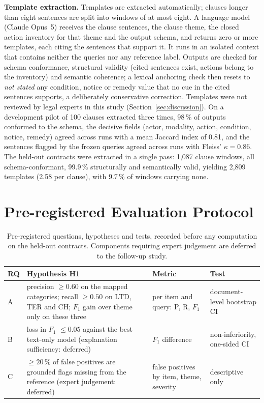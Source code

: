 \documentclass{IOS-Book-Article}
\begin{document}
\textbf{Template extraction.} Templates are extracted automatically; clauses longer than eight sentences are split into windows of at most eight. A language model (Claude Opus~5) receives the clause sentences, the clause theme, the closed action inventory for that theme and the output schema, and returns zero or more templates, each citing the sentences that support it. It runs in an isolated context that contains neither the queries nor any reference label. Outputs are checked for schema conformance, structural validity (cited sentences exist, actions belong to the inventory) and semantic coherence; a lexical anchoring check then resets to \emph{not stated} any condition, notice or remedy value that no cue in the cited sentences supports, a deliberately conservative correction. Templates were not reviewed by legal experts in this study (Section~\ref{sec:discussion}). On a development pilot of 100 clauses extracted three times, 98\,\% of outputs conformed to the schema, the decisive fields (actor, modality, action, condition, notice, remedy) agreed across runs with a mean Jaccard index of 0.81, and the sentences flagged by the frozen queries agreed across runs with Fleiss' $\kappa = 0.86$. The held-out contracts were extracted in a single pass: 1,087 clause windows, all schema-conformant, 99.9\,\% structurally and semantically valid, yielding 2,809 templates (2.58 per clause), with 9.7\,\% of windows carrying none.

\section{Pre-registered Evaluation Protocol}
\label{sec:protocol}
\begin{table}[t]
\caption{Pre-registered questions, hypotheses and tests, recorded before any computation on the held-out contracts. Components requiring expert judgement are deferred to the follow-up study.}
\label{tab:rq}
\centering
\footnotesize\setlength{\tabcolsep}{3pt}%
\begin{tabular}{@{}p{0.55cm} p{5.9cm} p{2.3cm} p{2.3cm}@{}}
\toprule
RQ & Hypothesis H1 & Metric & Test \\
\midrule
A & precision $\geq 0.60$ on the mapped categories; recall $\geq 0.50$ on LTD, TER and CH; $F_1$ gain over theme only on these three & per item and query: P, R, $F_1$ & document-level bootstrap CI \\
B & loss in $F_1$ $\leq 0.05$ against the best text-only model (explanation sufficiency: deferred) & $F_1$ difference & non-inferiority, one-sided CI \\
C & $\geq 20\,\%$ of false positives are grounded flags missing from the reference (expert judgement: deferred) & false positives by item, theme, severity & descriptive only \\
\bottomrule
\end{tabular}
\end{table}
\end{document}
